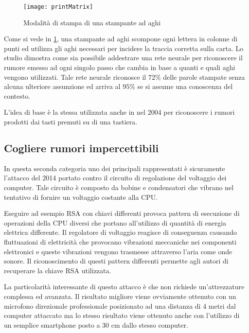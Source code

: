 		\begin{figure}
			\begin{center}
				\texttt{[image: printMatrix]}
				\caption{Modalità di stampa di una stampante ad aghi}
				\label{fig:matrixHead}
			\end{center}
		\end{figure}
		
		Come si vede in \cref{fig:matrixHead}, una stampante ad aghi scompone ogni lettera in colonne di punti ed utilizza gli aghi necessari per incidere la traccia corretta sulla carta. Lo studio dimostra come sia possibile addestrare una rete neurale per riconoscere il rumore emesso ad ogni singolo passo che cambia in base a quanti e quali aghi vengono utilizzati. Tale rete neurale riconosce il $72\%$ delle parole stampate senza alcuna ulteriore assunzione ed arriva al $95\%$ se si assume una conoscenza del contesto.
		
		L'idea di base è la stessa utilizzata anche in \cite{asonov2004keyboard} nel 2004 per riconoscere i rumori prodotti dai tasti premuti su di una tastiera.
	
	\subsection{Cogliere rumori impercettibili}	
		In questa seconda categoria uno dei principali rappresentati è sicuramente l'attacco\cite{genkin2014rsa} del 2014 portato contro il circuito di regolazione del voltaggio dei computer. Tale circuito è composto da bobine e condensatori che vibrano nel tentativo di fornire un voltaggio costante alla CPU.
		
		Eseguire ad esempio RSA con chiavi differenti provoca pattern di esecuzione di operazioni della CPU diversi che portano all'utilizzo di quantità di energia elettrica differente. Il regolatore di voltaggio reagisce di conseguenza causando fluttuazioni di elettricità che provocano vibrazioni meccaniche nei componenti elettronici e queste vibrazioni vengono trasmesse attraverso l'aria come onde sonore. Il riconoscimento di questi pattern differenti permette agli autori di recuperare la chiave RSA utilizzata.
		
		La particolarità interessante di questo attacco è che non richiede un'attrezzature complessa ed avanzata. Il risultato migliore viene ovviamente ottenuto con un microfono direzionale professionale posizionato ad una distanza di 4 metri dal computer attaccato ma lo stesso risultato viene ottenuto anche con l'utilizzo di un semplice smartphone posto a 30 cm dallo stesso computer.
		
